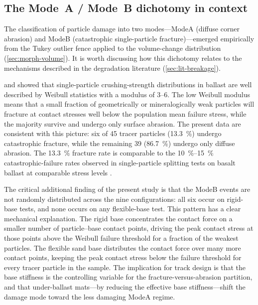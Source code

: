 \subsection{The Mode~A / Mode~B dichotomy in context}
\label{sec:morph-modes-discussion}

The classification of particle damage into two modes---\gls{ModeA}
(diffuse corner abrasion) and \gls{ModeB} (catastrophic single-particle
fracture)---emerged empirically from the Tukey outlier fence applied to
the volume-change distribution (\cref{sec:morph-volume}). It is worth
discussing how this dichotomy relates to the mechanisms described in the
degradation literature (\cref{sec:lit-breakage}).

\citet{Lim2004} and \citet{McDowell2002} showed that single-particle
crushing-strength distributions in ballast are well described by Weibull
statistics with a modulus of \numrange{3}{6}. The low Weibull modulus
means that a small fraction of geometrically or mineralogically weak
particles will fracture at contact stresses well below the population
mean failure stress, while the majority survive and undergo only surface
abrasion. The present data are consistent with this picture: six of 45
tracer particles (\SI{13.3}{\percent}) undergo catastrophic fracture,
while the remaining 39 (\SI{86.7}{\percent}) undergo only diffuse
abrasion. The \SI{13.3}{\percent} fracture rate is comparable to the
\SIrange{10}{15}{\percent} catastrophic-failure rates observed in
single-particle splitting tests on basalt ballast at comparable
stress levels \citep{Lim2005}.

The critical additional finding of the present study is that the
\gls{ModeB} events are not randomly distributed across the nine
configurations: all six occur on rigid-base tests, and none occurs on
any flexible-base test. This pattern has a clear mechanical explanation.
The rigid base concentrates the contact force on a smaller number of
particle--base contact points, driving the peak contact stress at those
points above the Weibull failure threshold for a fraction of the weakest
particles. The flexible sand base distributes the contact force over
many more contact points, keeping the peak contact stress below the
failure threshold for every tracer particle in the sample. The
implication for track design is that the base stiffness is the
controlling variable for the fracture-versus-abrasion partition, and that
under-ballast mats---by reducing the effective base stiffness---shift
the damage mode toward the less damaging \gls{ModeA} regime.

